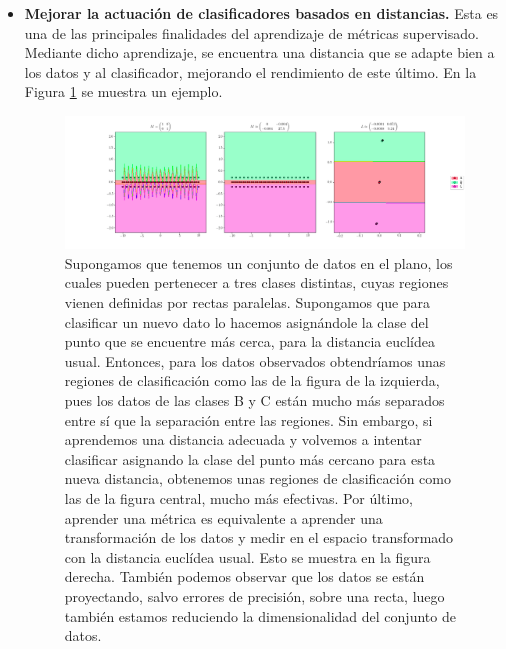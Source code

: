 \begin{itemize}
    \item \textbf{Mejorar la actuación de clasificadores basados en distancias.} Esta es una de las principales finalidades del aprendizaje de métricas supervisado. Mediante dicho aprendizaje, se encuentra una distancia que se adapte bien a los datos y al clasificador, mejorando el rendimiento de este último. En la Figura \ref{fig:mejorar_knn} se muestra un ejemplo.

    \begin{figure}[h]
    \centering
    \includegraphics[width=21cm,center]{./images/ex_learning_nca.png}
    \caption{Supongamos que tenemos un conjunto de datos en el plano, los cuales pueden pertenecer a tres clases distintas, cuyas regiones vienen definidas por rectas paralelas. Supongamos que para clasificar un nuevo dato lo hacemos asignándole la clase del punto que se encuentre más cerca, para la distancia euclídea usual. Entonces, para los datos observados obtendríamos unas regiones de clasificación como las de la figura de la izquierda, pues los datos de las clases B y C están mucho más separados entre sí que la separación entre las regiones. Sin embargo, si aprendemos una distancia adecuada y volvemos a intentar clasificar asignando la clase del punto más cercano para esta nueva distancia, obtenemos unas regiones de clasificación como las de la figura central, mucho más efectivas. Por último, aprender una métrica es equivalente a aprender una transformación de los datos y medir en el espacio transformado con la distancia euclídea usual. Esto se muestra en la figura derecha. También podemos observar que los datos se están proyectando, salvo errores de precisión, sobre una recta, luego también estamos reduciendo la dimensionalidad del conjunto de datos.} \label{fig:mejorar_knn}
    \end{figure}
    

\end{itemize}

